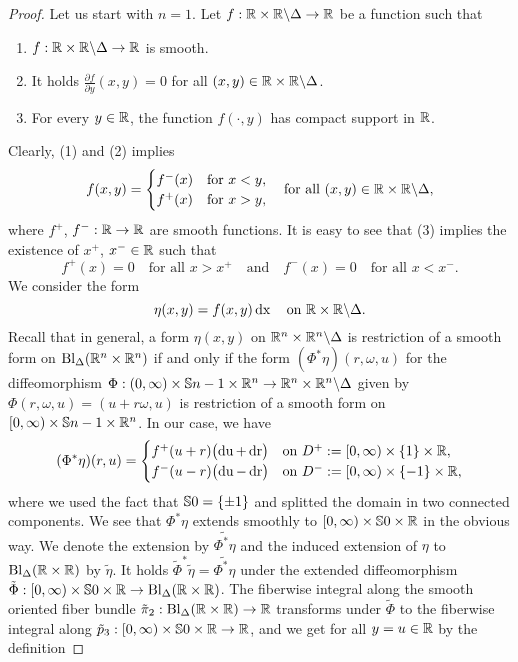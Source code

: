 \documentclass[\MainFolder/Text.tex]{subfiles}
\begin{document}
\begin{proof}
Let us start with $n=1$. Let $f: \mathbb{R}\times \mathbb{R}\backslash\Delta\rightarrow \mathbb{R}$ be a function such that 
\begin{enumerate}
 \item $f: \mathbb{R}\times \mathbb{R}\backslash\Delta\rightarrow \mathbb{R}$ is smooth.
 \item It holds $\frac{\partial f}{\partial y}(x,y) = 0$ for all $(x,y)\in \mathbb{R}\times \mathbb{R}\backslash \Delta$.
 \item For every $y\in \mathbb{R}$, the function $f(\cdot,y)$ has compact support in $\mathbb{R}$.
\end{enumerate} 
Clearly, (1) and (2) implies
\begin{equation}\label{Eq:PartialConst}
 f(x,y) = \begin{cases} f^-(x) & \text{for }x<y, \\ f^+(x) & \text{for }x>y, \end{cases}\quad\text{for all }(x,y)\in \mathbb{R}\times \mathbb{R}\backslash \Delta,
\end{equation}
where $f^+$, $f^-: \mathbb{R} \rightarrow \mathbb{R}$ are smooth functions. It is easy to see that (3) implies the existence of $x^+$, $x^-\in \mathbb{R}$ such that 
$$ f^+(x) = 0\quad\text{for all }x>x^+ \quad\text{and}\quad f^-(x) = 0\quad\text{for all }x<x^-. $$
We consider the form
\begin{equation}
\eta(x,y) = f(x,y) \operatorname{dx}\quad\text{on }\mathbb{R}\times\mathbb{R}\backslash\Delta.
\end{equation}
Recall that in general, a form $\eta(x,y)$ on $\mathbb{R}^n\times\mathbb{R}^n\backslash\Delta$ is restriction of a smooth form on $\mathrm{Bl}_\Delta(\mathbb{R}^n\times \mathbb{R}^n)$ if and only if the form $(\Phi^*\eta)(r,\omega,u)$ for the diffeomorphism $\Phi: (0,\infty) \times \mathbb{S}{n-1} \times \mathbb{R}^n \rightarrow \mathbb{R}^n \times \mathbb{R}^n \backslash \Delta$ given by $\Phi(r,\omega,u) = (u+r\omega,u)$ is restriction of a smooth form on $[0,\infty) \times \mathbb{S}{n-1}\times \mathbb{R}^n$. In our case, we have
$$ (\Phi^*\eta)(r,u) = \begin{cases} 
 f^+(u+r)\bigl(\operatorname{du}+\operatorname{dr}\bigr) & \text{on } D^+:= [0,\infty) \times \{1\}\times \mathbb{R}, \\
 f^-(u-r)\bigl(\operatorname{du}-\operatorname{dr}\bigr) & \text{on }D^-:=[0,\infty) \times \{-1\} \times \mathbb{R}, 
\end{cases} $$
where we used the fact that $\mathbb{S}{0} = \{\pm 1\}$ and splitted the domain in two connected components. We see that $\Phi^* \eta$ extends smoothly to $[0,\infty) \times \mathbb{S}{0}\times \mathbb{R}$ in the obvious way. We denote the extension by $\widetilde{\Phi^* \eta}$ and the induced extension of $\eta$ to $\mathrm{Bl}_\Delta(\mathbb{R}\times \mathbb{R})$ by $\tilde{\eta}$. It holds $\tilde{\Phi}^* \tilde{\eta} = \widetilde{\Phi^* \eta}$ under the extended diffeomorphism $\tilde{\Phi}: [0,\infty) \times \mathbb{S}{0} \times \mathbb{R} \rightarrow \mathrm{Bl}_\Delta(\mathbb{R}\times\mathbb{R})$. The fiberwise integral along the smooth oriented fiber bundle $\tilde{\pi}_2: \mathrm{Bl}_\Delta(\mathbb{R}\times \mathbb{R}) \rightarrow \mathbb{R}$ transforms under $\tilde{\Phi}$ to the fiberwise integral along $\tilde{p}_3: [0,\infty) \times \mathbb{S}{0} \times \mathbb{R} \rightarrow \mathbb{R}$, and we get for all $y=u \in \mathbb{R}$ by the definition

\end{proof}
\end{document}
